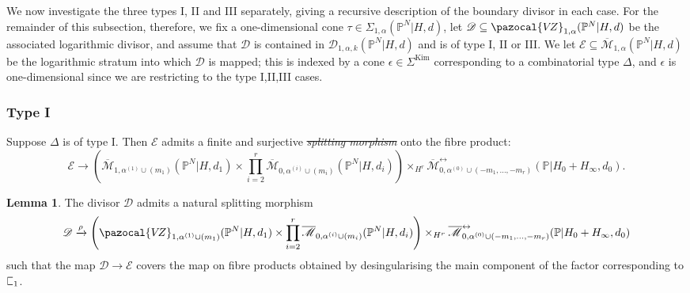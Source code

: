 \documentclass[11pt]{amsart}
\newcommand{\sqC}{\scalebox{0.8}[1.3]{$\sqsubset$}}
\newcommand{\Kim}{\operatorname{Kim}}
\newcommand{\PP}{\mathbb P}
\newcommand{\VZ}{\pazocal{V\!Z}}
\renewcommand{\to}{\rightarrow}
\newcommand{\Mcal}{\mathcal{M}}
\newcommand{\Dcal}{\mathcal{D}}
\newcommand{\Ecal}{\mathcal{E}}
\newcommand{\ol}[1]{\overline{#1}}
\theoremstyle{definition}
\newtheorem{lemma}[thm]{Lemma}
\theoremstyle{definition}
\providecommand{\DIFaddtex}[1]{{\protect\color{blue}\uwave{#1}}} %
\providecommand{\DIFdeltex}[1]{{\protect\color{red}\sout{#1}}}                      %
\providecommand{\DIFaddbegin}{} %
\providecommand{\DIFaddend}{} %
\providecommand{\DIFdelbegin}{} %
\providecommand{\DIFdelend}{} %
\providecommand{\DIFadd}[1]{\texorpdfstring{\DIFaddtex{#1}}{#1}} %
\providecommand{\DIFdel}[1]{\texorpdfstring{\DIFdeltex{#1}}{}} %
\begin{document}
We now investigate the three types I, II and III separately, giving a recursive description of the boundary divisor in each case. For the remainder of this subsection, therefore, we fix a one-dimensional cone $\tau \in \Sigma_{1,\alpha}(\PP^N|H,d)$, let $\Dcal \subseteq \VZ_{1,\alpha}(\PP^N|H,d)$ be the associated logarithmic divisor, and assume that $\Dcal$ is contained in $\Dcal_{1,\alpha,k}(\PP^N|H,d)$ and is of type I, II or III. We let $\Ecal \subseteq \ol\Mcal_{1,\alpha}(\PP^N|H,d)$ be the logarithmic stratum into which $\Dcal$ is mapped; this is indexed by a cone $\epsilon \in \Sigma^{\Kim}$ corresponding to a combinatorial type $\Delta$, and $\epsilon$ is one-dimensional since we are restricting to the type I,II,III cases.


\subsubsection{Type I}\label{subsubsection type A} Suppose $\Delta$ is of type I. Then $\Ecal$ admits a finite and surjective \DIFdelbegin \textit{\DIFdel{splitting morphism}} %
\DIFdelend \DIFaddbegin \textbf{\DIFadd{splitting morphism}} \DIFaddend onto the fibre product:
\begin{equation*} \Ecal \to \left( \ol\Mcal_{1,\alpha^{(1)}\cup(m_1)}(\PP^N|H,d_1) \times \prod_{i=2}^r \ol\Mcal_{0,\alpha^{(i)}\cup(m_i)}(\PP^N|H,d_i) \right) \times_{H^r} \ol\Mcal^{\leftrightarrow}_{0,\alpha^{(0)}\cup (-m_1,\ldots,-m_r)}(\mathbb{P}|H_0+H_\infty,d_0).\end{equation*}

\begin{lemma} \label{Lemma type A gluing} The divisor $\Dcal$ admits a natural splitting morphism
\begin{equation*}\Dcal \xrightarrow{\rho} \left(\VZ_{1,\alpha^{(1)}\cup(m_1)}(\PP^N|H,d_1)\times\prod_{i=2}^r \ol\Mcal_{0,\alpha^{(i)}\cup(m_i)}(\PP^N|H,d_i)\right) \times_{H^r} \ol\Mcal^{\leftrightarrow}_{0,\alpha^{(0)}\cup (-m_1,\ldots,-m_r)}(\mathbb{P}|H_0+H_\infty,d_0)\end{equation*}
such that the map $\Dcal \to \Ecal$ covers the map on fibre products obtained by desingularising the main component of the factor corresponding to $\sqC_1$.\end{lemma}
\end{document}
